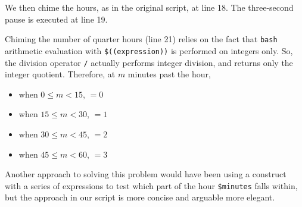 \documentclass{article}
\begin{document}
\begin{bashinline}
\end{bashinline}

We then chime the hours, as in the original script, at line 18. The three-second pause is executed at line 19.

Chiming the number of quarter hours (line 21) relies on the fact that \texttt{bash} arithmetic evaluation with \texttt{\$((expression))} is performed on integers only. So, the division operator \texttt{/} actually performs integer division, and returns only the integer quotient. Therefore, at $m$ minutes past the hour,
\begin{itemize}
    \item when $0 \leq m < 15$,  $= 0$
    \item when $15 \leq m < 30$,  $= 1$
    \item when $30 \leq m < 45$,  $= 2$
    \item when $45 \leq m < 60$,  $= 3$
\end{itemize}

Another approach to solving this problem would have been using a  construct with a series of expressions to test which part of the hour \texttt{\$minutes} falls within, but the approach in our script is more concise and arguable more elegant.
\end{document}
